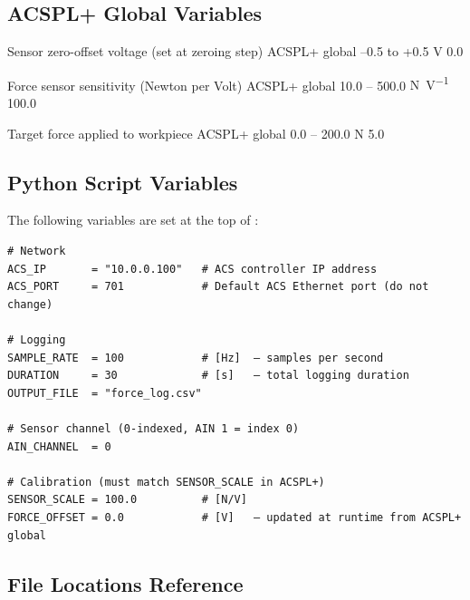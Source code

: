 \subsection{ACSPL+ Global Variables}
\label{sec:params:acspl}

\begin{paramtable}

    {Sensor zero-offset voltage (set at zeroing step)}
    {ACSPL+ global}
    {–0.5 to +0.5}
    {\si{\volt}}
    {0.0}

    {Force sensor sensitivity (Newton per Volt)}
    {ACSPL+ global}
    {10.0 – 500.0}
    {\si{\newton\per\volt}}
    {100.0}

    {Target force applied to workpiece}
    {ACSPL+ global}
    {0.0 – 200.0}
    {\si{\newton}}
    {5.0}

\end{paramtable}


\subsection{Python Script Variables}
\label{sec:params:python}

The following variables are set at the top of :

\begin{configcode}
\begin{lstlisting}
# Network
ACS_IP       = "10.0.0.100"   # ACS controller IP address
ACS_PORT     = 701            # Default ACS Ethernet port (do not change)

# Logging
SAMPLE_RATE  = 100            # [Hz]  — samples per second
DURATION     = 30             # [s]   — total logging duration
OUTPUT_FILE  = "force_log.csv"

# Sensor channel (0-indexed, AIN 1 = index 0)
AIN_CHANNEL  = 0

# Calibration (must match SENSOR_SCALE in ACSPL+)
SENSOR_SCALE = 100.0          # [N/V]
FORCE_OFFSET = 0.0            # [V]   — updated at runtime from ACSPL+ global
\end{lstlisting}
\end{configcode}


\subsection{File Locations Reference}
\label{sec:params:files}

